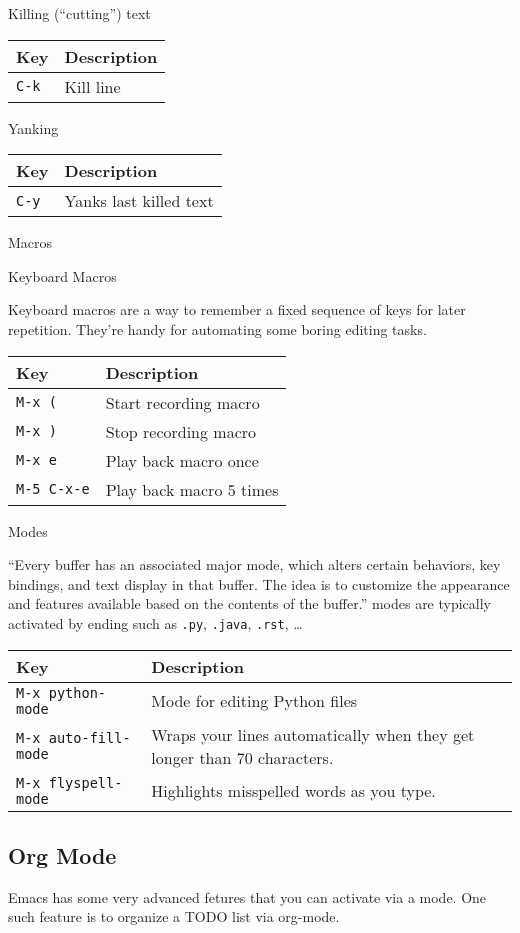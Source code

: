 Killing (``cutting'') text

\begin{longtable}[]{ll}
\toprule
Key & Description\tabularnewline
\midrule
\endhead
\verb|C-k| & Kill line\tabularnewline
\bottomrule
\end{longtable}

Yanking

\begin{longtable}[]{ll}
\toprule
Key & Description\tabularnewline
\midrule
\endhead
\verb|C-y| & Yanks last killed text\tabularnewline
\bottomrule
\end{longtable}

Macros

Keyboard Macros

Keyboard macros are a way to remember a fixed sequence of keys for later
repetition. They're handy for automating some boring editing tasks.

\begin{longtable}[]{ll}
\toprule
Key & Description\tabularnewline
\midrule
\endhead
\verb|M-x (| & Start recording macro\tabularnewline
\verb|M-x )| & Stop recording macro\tabularnewline
\verb|M-x e| & Play back macro once\tabularnewline
\verb|M-5 C-x-e| & Play back macro 5 times\tabularnewline
\bottomrule
\end{longtable}

Modes

``Every buffer has an associated major mode, which alters certain
behaviors, key bindings, and text display in that buffer. The idea is to
customize the appearance and features available based on the contents of
the buffer.'' modes are typically activated by ending such as \verb|.py|,
\verb|.java|, \verb|.rst|, \ldots{}

\begin{longtable}[]{ll}
\toprule
Key & Description\tabularnewline
\midrule
\endhead
\verb|M-x python-mode| & Mode for editing Python files\tabularnewline
\verb|M-x auto-fill-mode| & Wraps your lines automatically when they get longer
than 70 characters.\tabularnewline
\verb|M-x flyspell-mode| & Highlights misspelled words as you type.\tabularnewline
\bottomrule
\end{longtable}


\subsection{Org Mode}

Emacs has some very advanced fetures that you can activate via a
mode. One such feature is to organize a TODO list via org-mode.

